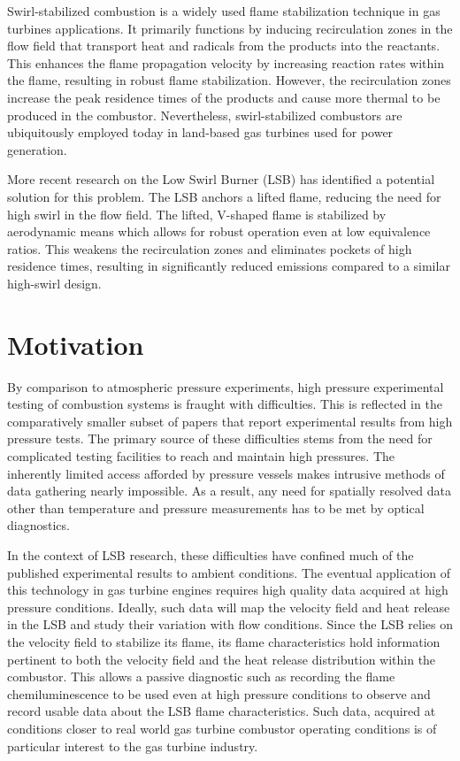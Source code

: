 Swirl-stabilized combustion is a widely used flame stabilization technique in gas turbines applications.\cite{1974-syred,1977-lilley}
It primarily functions by inducing recirculation zones in the flow field that transport heat and radicals from the products into the reactants.
This enhances the flame propagation velocity by increasing reaction rates within the flame, resulting in robust flame stabilization.
However, the recirculation zones increase the peak residence times of the products and cause more thermal  to be produced in the combustor.
Nevertheless, swirl-stabilized combustors are ubiquitously employed today in land-based gas turbines used for power generation.

More recent research\cite{1995-bedat} on the Low Swirl Burner (LSB) has identified a potential solution for this problem.
The LSB anchors a lifted flame, reducing the need for high swirl in the flow field.
The lifted, V-shaped flame is stabilized by aerodynamic means which allows for robust operation even at low equivalence ratios.
This weakens the recirculation zones and eliminates pockets of high residence times, resulting in significantly reduced  emissions compared to a similar high-swirl design.

\section{Motivation}

By comparison to atmospheric pressure experiments, high pressure experimental testing of combustion systems is fraught with difficulties.
This is reflected in the comparatively smaller subset of papers that report experimental results from high pressure tests.
The primary source of these difficulties stems from the need for complicated testing facilities to reach and maintain high pressures.
The inherently limited access afforded by pressure vessels makes intrusive methods of data gathering nearly impossible.
As a result, any need for spatially resolved data other than temperature and pressure measurements has to be met by optical diagnostics.

In the context of LSB research, these difficulties have confined much of the published experimental results to ambient conditions.
The eventual application of this technology in gas turbine engines requires high quality data acquired at high pressure conditions.
Ideally, such data will map the velocity field and heat release in the LSB and study their variation with flow conditions.
Since the LSB relies on the velocity field to stabilize its flame, its flame characteristics hold information pertinent to both the velocity field and the heat release distribution within the combustor.
This allows a passive diagnostic such as recording the flame chemiluminescence to be used even at high pressure conditions to observe and record usable data about the LSB flame characteristics.
Such data, acquired at conditions closer to real world gas turbine combustor operating conditions is of particular interest to the gas turbine industry.

